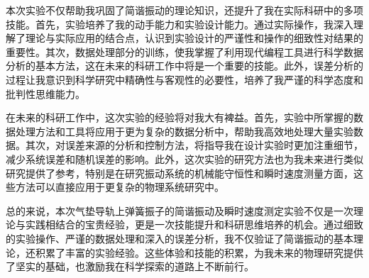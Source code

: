 \documentclass[UTF-8,twoside,cs4size]{ctexart}
\begin{document}
本次实验不仅帮助我巩固了简谐振动的理论知识，还提升了我在实际科研中的多项技能。首先，实验培养了我的动手能力和实验设计能力。通过实际操作，我深入理解了理论与实际应用的结合点，认识到实验设计的严谨性和操作的细致性对结果的重要性。其次，数据处理部分的训练，使我掌握了利用现代编程工具进行科学数据分析的基本方法，这在未来的科研工作中将是一个重要的技能。此外，误差分析的过程让我意识到科学研究中精确性与客观性的必要性，培养了我严谨的科学态度和批判性思维能力。

在未来的科研工作中，这次实验的经验将对我大有裨益。首先，实验中所掌握的数据处理方法和工具将应用于更为复杂的数据分析中，帮助我高效地处理大量实验数据。其次，对误差来源的分析和控制方法，将指导我在设计实验时更加注重细节，减少系统误差和随机误差的影响。此外，这次实验的研究方法也为我未来进行类似研究提供了参考，特别是在研究振动系统的机械能守恒性和瞬时速度测量方面，这些方法可以直接应用于更复杂的物理系统研究中。

总的来说，本次气垫导轨上弹簧振子的简谐振动及瞬时速度测定实验不仅是一次理论与实践相结合的宝贵经验，更是一次技能提升和科研思维培养的机会。通过细致的实验操作、严谨的数据处理和深入的误差分析，我不仅验证了简谐振动的基本理论，还积累了丰富的实验经验。这些体验和技能的积累，为我未来的物理研究提供了坚实的基础，也激励我在科学探索的道路上不断前行。
\end{document}
